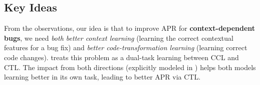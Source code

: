 
\subsection{Key Ideas}
\label{sec:key-idea}


From the observations, our idea is that to improve APR for {\bf
  context-dependent bugs}, we need {\em both better context learning}
(learning the correct contextual features for a bug fix) and {\em
  better code-transformation learning} (learning correct code
changes). {\tool} treats this problem as a dual-task learning between
CCL and CTL. The impact from both directions (explicitly modeled in
{\tool}) helps both models learning better in its own task, leading to
better APR via CTL.







